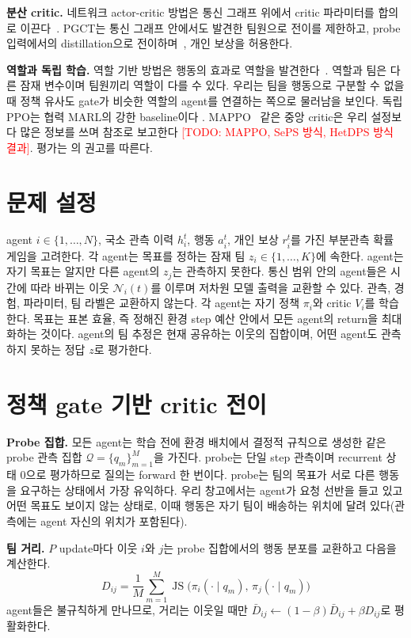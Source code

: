 \documentclass[twocolumn,10pt]{article}
\newcommand{\todo}[1]{\textcolor{red}{[TODO: #1]}}
\newcommand{\JS}{\operatorname{JS}}
\newcommand{\ours}{PGCT}
\begin{document}
\textbf{분산 critic.} 네트워크 actor-critic 방법은 통신 그래프 위에서 critic 파라미터를 합의로 이끈다~\cite{zhang2018networked}. \ours{}는 통신 그래프 안에서도
발견한 팀원으로 전이를 제한하고, probe 입력에서의 distillation으로 전이하며~\cite{rusu2016policy}, 개인 보상을 허용한다.

\textbf{역할과 독립 학습.} 역할 기반 방법은 행동의 효과로 역할을 발견한다~\cite{wang2021rode}. 역할과 팀은 다른 잠재 변수이며 팀원끼리 역할이 다를 수 있다. 우리는
팀을 행동으로 구분할 수 없을 때 정책 유사도 gate가 비슷한 역할의 agent를 연결하는 쪽으로 물러남을 보인다. 독립 PPO는 협력 MARL의 강한 baseline이다
\cite{schulman2017ppo,dewitt2020ippo}. MAPPO~\cite{yu2022mappo} 같은 중앙 critic은 우리 설정보다 많은 정보를 쓰며 참조로 보고한다
\todo{MAPPO, SePS 방식, HetDPS 방식 결과}. 평가는 \cite{agarwal2021precipice}의 권고를 따른다.

\section{문제 설정}
agent $i\in\{1,\dots,N\}$, 국소 관측 이력 $h_i^t$, 행동 $a_i^t$, 개인 보상 $r_i^t$를 가진 부분관측 확률 게임을 고려한다. 각 agent는 목표를 정하는 잠재 팀
$z_i\in\{1,\dots,K\}$에 속한다. agent는 자기 목표는 알지만 다른 agent의 $z_j$는 관측하지 못한다. 통신 범위 안의 agent들은 시간에 따라 바뀌는 이웃
$\mathcal{N}_i(t)$를 이루며 저차원 모델 출력을 교환할 수 있다. 관측, 경험, 파라미터, 팀 라벨은 교환하지 않는다. 각 agent는 자기 정책 $\pi_i$와 critic $V_i$를
학습한다. 목표는 표본 효율, 즉 정해진 환경 step 예산 안에서 모든 agent의 return을 최대화하는 것이다. agent의 팀 추정은 현재 공유하는 이웃의 집합이며, 어떤
agent도 관측하지 못하는 정답 $z$로 평가한다.

\section{정책 gate 기반 critic 전이}
\label{sec:method}
\textbf{Probe 집합.} 모든 agent는 학습 전에 환경 배치에서 결정적 규칙으로 생성한 같은 probe 관측 집합 $\mathcal{Q}=\{q_m\}_{m=1}^{M}$을 가진다. probe는 단일
step 관측이며 recurrent 상태 0으로 평가하므로 질의는 forward 한 번이다. probe는 팀의 목표가 서로 다른 행동을 요구하는 상태에서 가장 유익하다. 우리 창고에서는
agent가 요청 선반을 들고 있고 어떤 목표도 보이지 않는 상태로, 이때 행동은 자기 팀이 배송하는 위치에 달려 있다(관측에는 agent 자신의 위치가 포함된다).

\textbf{팀 거리.} $P$ update마다 이웃 $i$와 $j$는 probe 집합에서의 행동 분포를 교환하고 다음을 계산한다.
\begin{equation}
  D_{ij} = \frac{1}{M}\sum_{m=1}^{M} \JS\big(\pi_i(\cdot\mid q_m),\, \pi_j(\cdot\mid q_m)\big)
\end{equation}
agent들은 불규칙하게 만나므로, 거리는 이웃일 때만 $\bar D_{ij}\leftarrow(1-\beta)\bar D_{ij}+\beta D_{ij}$로 평활화한다.
\end{document}
